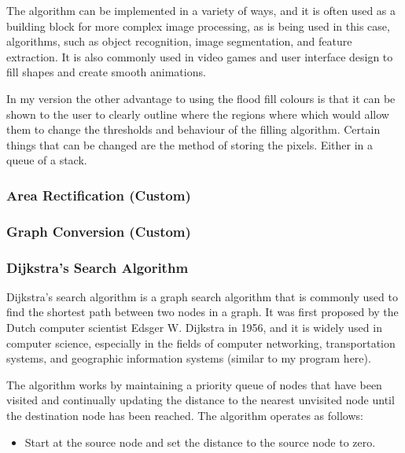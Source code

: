 \begin{FlushLeft}
    The algorithm can be implemented in a variety of ways, and it is often used as a building block for more complex image processing, as is being used in this case, algorithms, such as object recognition, image segmentation, and feature extraction. It is also commonly used in video games and user interface design to fill shapes and create smooth animations. \\ \bk

    In my version the other advantage to using the flood fill colours is that it can be shown to the user to clearly outline where the regions where which would allow them to change the thresholds and behaviour of the filling algorithm. Certain things that can be changed are the method of storing the pixels. Either in a queue of a stack. \\ 
    \bk

    \subsubsection{Area Rectification (Custom)}
    \bk

    \subsubsection{Graph Conversion (Custom)}
    \bk

    \subsubsection{Dijkstra's Search Algorithm}
    Dijkstra's search algorithm is a graph search algorithm that is commonly used to find the shortest path between two nodes in a graph. It was first proposed by the Dutch computer scientist Edsger W. Dijkstra in 1956, and it is widely used in computer science, especially in the fields of computer networking, transportation systems, and geographic information systems (similar to my program here). \\ \bk

    The algorithm works by maintaining a priority queue of nodes that have been visited and continually updating the distance to the nearest unvisited node until the destination node has been reached. The algorithm operates as follows:\\

    \begin{itemize}
    \item Start at the source node and set the distance to the source node to zero.


\end{itemize}
\end{FlushLeft}
